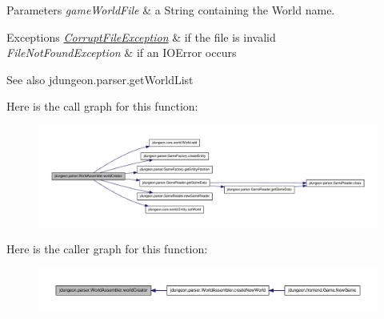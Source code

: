 \begin{DoxyParams}{Parameters}
{\em gameWorldFile} & a String containing the World name.\\
\hline
\end{DoxyParams}

\begin{DoxyExceptions}{Exceptions}
{\em \hyperlink{classjdungeon_1_1parser_1_1_corrupt_file_exception}{CorruptFileException}} & if the file is invalid \\
\hline
{\em FileNotFoundException} & if an IOError occurs\\
\hline
\end{DoxyExceptions}
\begin{DoxySeeAlso}{See also}
jdungeon.parser.getWorldList 
\end{DoxySeeAlso}


Here is the call graph for this function:
\nopagebreak
\begin{figure}[H]
\begin{center}
\leavevmode
\includegraphics[width=400pt]{classjdungeon_1_1parser_1_1_world_assembler_ae0b694e0b28f0c1ecfdbd6e7175b6906_cgraph}
\end{center}
\end{figure}




Here is the caller graph for this function:
\nopagebreak
\begin{figure}[H]
\begin{center}
\leavevmode
\includegraphics[width=400pt]{classjdungeon_1_1parser_1_1_world_assembler_ae0b694e0b28f0c1ecfdbd6e7175b6906_icgraph}
\end{center}
\end{figure}


